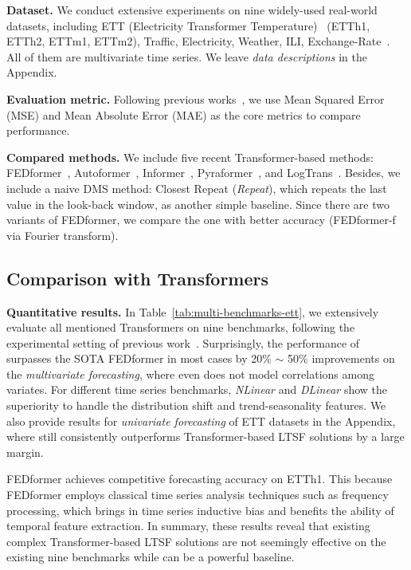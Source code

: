 \textbf{Dataset.} We conduct extensive experiments on nine widely-used real-world datasets, including ETT (Electricity Transformer Temperature)~\cite{informer} (ETTh1, ETTh2, ETTm1, ETTm2), Traffic, Electricity, Weather, ILI, Exchange-Rate~\cite{GuokunLai2017lstm}. All of them are multivariate time series. We leave \emph{data descriptions} in the Appendix.


\textbf{Evaluation metric.}
Following previous works~\cite{informer,xu2021autoformer,zhou2022fedformer}, we use Mean Squared Error (MSE) and Mean Absolute Error (MAE) as the core metrics to compare performance. 


\textbf{Compared methods.} We include five recent Transformer-based methods: FEDformer~\cite{zhou2022fedformer}, Autoformer~\cite{xu2021autoformer}, Informer~\cite{informer}, Pyraformer~\cite{liu2021pyraformer}, and LogTrans~\cite{li2019LogTrans}. 
Besides, we include a naive DMS method: Closest Repeat (\emph{Repeat}), which repeats the last value in the look-back window, as another simple baseline. Since there are two variants of FEDformer, we compare the one with better accuracy (FEDformer-f via Fourier transform). 


\subsection{Comparison with Transformers}


\textbf{Quantitative results.} In Table~\ref{tab:multi-benchmarks-ett}, we extensively evaluate all mentioned Transformers on nine benchmarks, following the experimental setting of previous work~\cite{xu2021autoformer,zhou2022fedformer,informer}.
%
Surprisingly, the performance of \modelname surpasses the SOTA FEDformer in most cases by 20\% $\sim$ 50\% improvements on the \emph{multivariate forecasting}, where \modelname even does not model correlations among variates. For different time series benchmarks, \emph{NLinear} and \emph{DLinear} show the superiority to handle the distribution shift and trend-seasonality features.
%
%
We also provide results for \emph{univariate forecasting} of ETT datasets in the Appendix, where \modelname still consistently outperforms Transformer-based LTSF solutions by a large margin.
%

FEDformer achieves competitive forecasting accuracy on ETTh1. This because FEDformer employs classical time series analysis techniques such as frequency processing, which brings in time series inductive bias and benefits the ability of temporal feature extraction. 
In summary, these results reveal that existing complex Transformer-based LTSF solutions are not seemingly effective on the existing nine benchmarks while \modelname can be a powerful baseline. 



